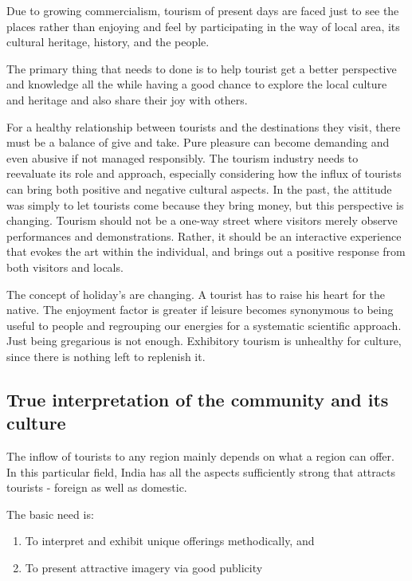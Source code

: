 Due to growing commercialism, tourism of present days are faced just to see the places rather than enjoying and feel by participating in the way of local area, its cultural heritage, history, and the people.

The primary thing that needs to done is to help tourist get a better perspective and knowledge all the while having a good chance to explore the local culture and heritage and also share their joy with others.

For a healthy relationship between tourists and the destinations they visit, there must be a balance of give and take. Pure pleasure can become demanding and even abusive if not managed responsibly. The tourism industry needs to reevaluate its role and approach, especially considering how the influx of tourists can bring both positive and negative cultural aspects. In the past, the attitude was simply to let tourists come because they bring money, but this perspective is changing. Tourism should not be a one-way street where visitors merely observe performances and demonstrations. Rather, it should be an interactive experience that evokes the art within the individual, and brings out a positive response from both visitors and locals.

The concept of holiday's are changing. A tourist has to raise his heart for the native. The enjoyment factor is greater if leisure becomes synonymous to being useful to people and regrouping our energies for a systematic scientific approach. Just being gregarious is not enough. Exhibitory tourism is unhealthy for culture, since there is nothing left to replenish it.


\subsection{True interpretation of the community and its culture} %
\label{sub:tic}

The inflow of tourists to any region mainly depends on what a region can offer. In this particular field, India has all the aspects sufficiently strong that attracts tourists - foreign as well as domestic.

The basic need is:

\begin{enumerate}
  \item To interpret and exhibit unique offerings methodically, and
  \item To present attractive imagery via good publicity
\end{enumerate}

